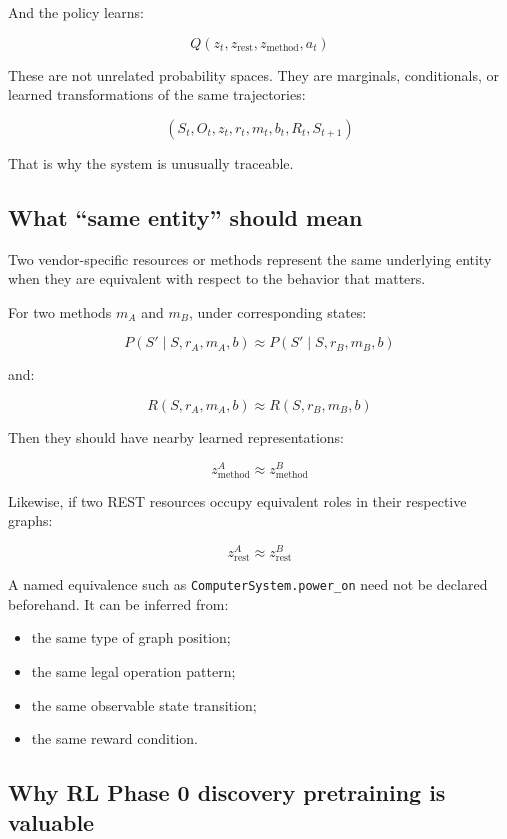 \documentclass{article}
\begin{document}
And the policy learns:

$$
Q\left(z_t, z_{\text{rest}}, z_{\text{method}}, a_t\right)
$$

These are not unrelated probability spaces. They are marginals, conditionals, or learned transformations of the same trajectories:

$$
\left(S_t, O_t, z_t, r_t, m_t, b_t, R_t, S_{t+1}\right)
$$

That is why the system is unusually traceable.

\subsection*{What ``same entity'' should mean}

Two vendor-specific resources or methods represent the same underlying entity when they are equivalent with respect to the behavior that matters.

For two methods $m_A$ and $m_B$, under corresponding states:

$$
P\left(S' \mid S, r_A, m_A, b\right) \approx P\left(S' \mid S, r_B, m_B, b\right)
$$

and:

$$
R\left(S, r_A, m_A, b\right) \approx R\left(S, r_B, m_B, b\right)
$$

Then they should have nearby learned representations:

$$
z_{\text{method}}^A \approx z_{\text{method}}^B
$$

Likewise, if two REST resources occupy equivalent roles in their respective graphs:

$$
z_{\text{rest}}^A \approx z_{\text{rest}}^B
$$

A named equivalence such as \texttt{ComputerSystem.power\_on} need not be declared beforehand. It can be inferred from:

\begin{itemize}
  \item the same type of graph position;
  \item the same legal operation pattern;
  \item the same observable state transition;
  \item the same reward condition.
\end{itemize}

\subsection*{Why RL Phase 0 discovery pretraining is valuable}
\end{document}
